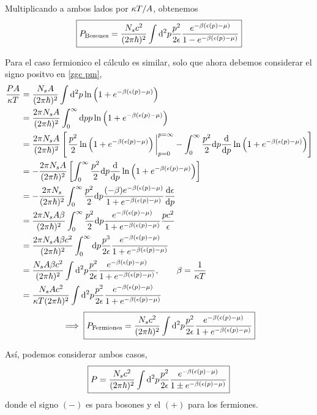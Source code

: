 \begin{sol}
Multiplicando a ambos lados por $\kappa T/A$, obtenemos
\begin{equation}
 \boxed{ P_{\rm Bosones}=\frac{N_s  c^2}{(2\pi\hbar)^2}\int\dd^2p \frac{p^2}{2\epsilon}\frac{e^{-\beta(\epsilon(p)-\mu )}}{1-e^{-\beta(\epsilon(p)-\mu )}}}
\end{equation}

Para el caso fermionico el cálculo es similar, solo que ahora debemos considerar el signo positvo en \eqref{zgc pm},
\begin{align}
	\frac{PA}{\k T}&=\frac{N_sA}{(2\p\hbar)^2}\int \dd^2p\ln\left(1+e^{-\b(\epsilon(p)-\m )}\right)\\
	&=\frac{2\p N_sA}{(2\p\hbar)^2}\int_0^\infty\dd p p\ln\left(1+e^{-\b(\epsilon(p)-\m )}\right)\\
	&=\frac{2\p N_sA}{(2\p\hbar)^2}\left[\eval{\frac{p^2}{2}\ln\left(1+e^{-\b(\epsilon(p)-\m )}\right)}_{p=0}^{p=\infty} -\int_0^\infty\frac{p^2}{2}\dd p\dv{p}\ln\left(1+e^{-\b(\epsilon(p)-\m )}\right)\right]\\
	&=-\frac{2\p N_sA}{(2\p\hbar)^2}\left[\int_0^\infty\frac{p^2}{2}\dd p\dv{p}\ln\left(1+e^{-\b(\epsilon(p)-\m )}\right)\right]\\
	&=-\frac{2\p N_s}{(2\p\hbar)^2}\int_0^\infty\frac{p^2}{2}\dd p\frac{(-\b  )e^{-\b(\epsilon(p)-\m )}}{1+e^{-\b(\epsilon(p)-\m )}}\dv{\epsilon}{p}\\
	&=\frac{2\p N_s A\b }{(2\p\hbar)^2}\int_0^\infty\frac{p^2}{2}\dd p\frac{e^{-\b(\epsilon(p)-\m )} }{1+e^{-\b(\epsilon(p)-\m )}}\frac{pc^2}{\epsilon}\\
	&=\frac{2\p N_s A\b c^2}{(2\p\hbar)^2}\int_0^\infty\dd p\frac{p^3}{2\epsilon}\frac{e^{-\b(\epsilon(p)-\m )}}{1+e^{-\b(\epsilon(p)-\m )}}\\
	&=\frac{N_s A\b c^2}{(2\p\hbar)^2}\int\dd^2p \frac{p^2}{2\epsilon}\frac{e^{-\b(\epsilon(p)-\m )}}{1+e^{-\b(\epsilon(p)-\m )}},\qquad \b=\frac{1}{\k T}\\
	&=\frac{N_s A c^2}{\k T(2\p\hbar)^2}\int\dd^2p \frac{p^2}{2\epsilon}\frac{e^{-\b(\epsilon(p)-\m )}}{1+e^{-\b(\epsilon(p)-\m )}}
\end{align}
\begin{equation}
  \implies \boxed{P_{\rm Fermiones}=\frac{N_s  c^2}{(2\pi\hbar)^2}\int\dd^2p \frac{p^2}{2\epsilon}\frac{e^{-\beta(\epsilon(p)-\mu )}}{1+e^{-\beta(\epsilon(p)-\mu )}}}
\end{equation}

Así, podemos considerar ambos casos,
\begin{equation}
 \boxed{ P=\frac{N_s  c^2}{(2\pi\hbar)^2}\int\dd^2p \frac{p^2}{2\epsilon}\frac{e^{-\beta(\epsilon(p)-\mu )}}{1\pm e^{-\beta(\epsilon(p)-\mu )}}}
\end{equation}
donde el signo $(-)$ es para bosones y el $(+)$ para los fermiones.
\end{sol}